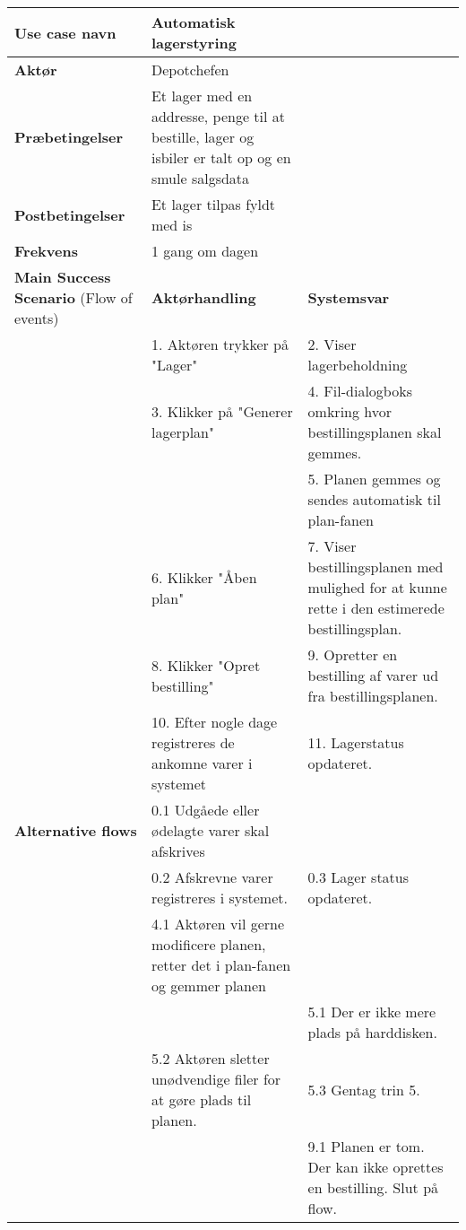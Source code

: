 \begin{longtable}{ |p{120pt}|p{120pt}|p{120pt}| }
    \hline
    \textbf{Use case navn} & Automatisk lagerstyring & \\
    \hline
    \textbf{Aktør} & Depotchefen & \\
    \hline
    \textbf{Præbetingelser} & Et lager med en addresse, penge til at bestille, lager og isbiler er talt op og en smule salgsdata & \\
    \hline
    \textbf{Postbetingelser} & Et lager tilpas fyldt med is & \\
    \hline
    \textbf{Frekvens} & 1 gang om dagen & \\
    \hline
    \textbf{Main Success Scenario} (Flow of events) & \textbf{Aktørhandling} & \textbf{Systemsvar} \\
    \hline
    & 1. Aktøren trykker på "Lager" & 2. Viser lagerbeholdning \\
    \hline
    & 3. Klikker på "Generer lagerplan" & 4. Fil-dialogboks omkring hvor bestillingsplanen skal gemmes. \\
    & & 5. Planen gemmes og sendes automatisk til plan-fanen \\
    \hline
    & 6. Klikker "Åben plan" & 7. Viser bestillingsplanen med mulighed for at kunne rette i den estimerede bestillingsplan. \\
    \hline
    & 8. Klikker "Opret bestilling" & 9. Opretter en bestilling af varer ud fra bestillingsplanen. \\
    \hline
    & 10. Efter nogle dage registreres de ankomne varer i systemet & 11. Lagerstatus opdateret. \\
    \hline
    \textbf{Alternative flows} & 0.1 Udgåede eller ødelagte varer skal afskrives & \\
    \hline
    & 0.2 Afskrevne varer registreres i systemet. & 0.3 Lager status opdateret. \\
    \hline
    & 4.1 Aktøren vil gerne modificere planen, retter det i plan-fanen og gemmer planen & \\
    \hline
    & & 5.1 Der er ikke mere plads på harddisken. \\
    \hline
    & 5.2 Aktøren sletter unødvendige filer for at gøre plads til planen. & 5.3 Gentag trin 5.\\
    \hline
    & & 9.1 Planen er tom. Der kan ikke oprettes en bestilling. Slut på flow. \\
    \hline
\end{longtable}


